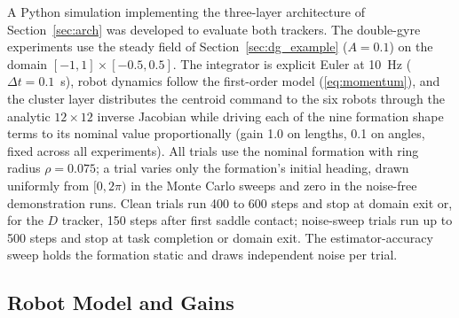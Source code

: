 \documentclass[lettersize,journal]{IEEEtran}
\begin{document}
A Python simulation implementing the three-layer architecture of
Section~\ref{sec:arch} was developed to evaluate both trackers.
The double-gyre experiments use the steady field of
Section~\ref{sec:dg_example} ($A = 0.1$) on the domain $[-1, 1] \times
[-0.5, 0.5]$. The integrator is explicit Euler at 10~Hz ($\Delta t =
0.1$~s), robot dynamics follow the first-order model
(\ref{eq:momentum}), and the cluster layer distributes the centroid
command to the six robots through the analytic $12 \times 12$ inverse
Jacobian while driving each of the nine formation shape terms to its
nominal value proportionally (gain 1.0 on lengths, 0.1 on angles, fixed
across all experiments). All trials use the nominal formation with ring
radius $\rho = 0.075$; a trial varies only the formation's initial
heading, drawn uniformly from $[0, 2\pi)$ in the Monte Carlo sweeps and
zero in the noise-free demonstration runs. Clean trials run 400 to 600
steps and stop at domain exit or, for the $D$ tracker, 150 steps after
first saddle contact; noise-sweep trials run up to 500 steps and stop
at task completion or domain exit. The estimator-accuracy sweep holds
the formation static and draws independent noise per trial.

\subsection{Robot Model and Gains}
\label{sec:robot_model}
\end{document}
